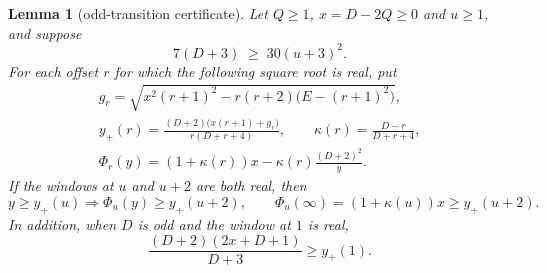 \documentclass[twoside,10pt]{article}
\numberwithin{equation}{section}
\theoremstyle{slbody}
\newtheorem{lemma}[theorem]{Lemma}
\theoremstyle{definition}
\theoremstyle{remark}
\numberwithin{theorem}{section}
\begin{document}
\begin{lemma}[odd-transition certificate]\label{lem:odd-transition}
Let $Q\ge1$, $x=D-2Q\ge0$ and $u\ge1$, and suppose
\[
 7(D+3)\;\ge\;30(u+3)^2 .
\]
For each offset $r$ for which the following square root is real, put
\begin{equation}\label{eq:yplus}
\begin{gathered}
 g_r=\sqrt{x^2(r+1)^2-r(r+2)\bigl(E-(r+1)^2\bigr)},\\
 y_+(r)=\frac{(D+2)\bigl(x(r+1)+g_r\bigr)}
                  {r(D+r+4)},\qquad
 \kappa(r)=\frac{D-r}{D+r+4},\\
 \Phi_r(y)=(1+\kappa(r))x-\kappa(r)\frac{(D+2)^2}{y}.
\end{gathered}
\end{equation}
If the windows at $u$ and $u+2$ are both real, then
\[
 y\ge y_+(u)\Longrightarrow \Phi_u(y)\ge y_+(u+2),
 \qquad
 \Phi_u(\infty)=(1+\kappa(u))x\ge y_+(u+2).
\]
In addition, when $D$ is odd and the window at $1$ is real,
\[
 \frac{(D+2)(2x+D+1)}{D+3}\ge y_+(1).
\]
\end{lemma}
\end{document}
